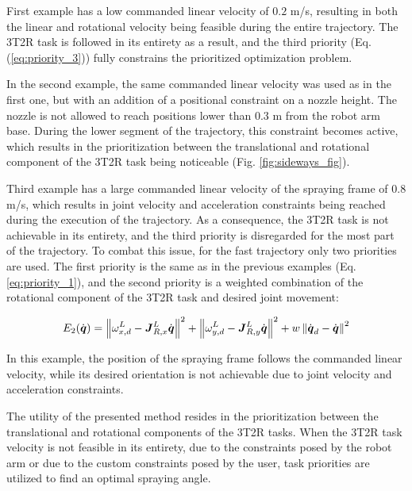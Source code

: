 First example has a low commanded linear velocity of $0.2$ m/s, resulting in both the linear and rotational velocity being feasible during the entire trajectory. The 3T2R task is followed in its entirety as a result, and the third priority (Eq. (\ref{eq:priority_3})) fully constrains the prioritized optimization problem. 

In the second example, the same commanded linear velocity was used as in the first one, but with an addition of a positional constraint on a nozzle height. The nozzle is not allowed to reach positions lower than $0.3$ m from the robot arm base. During the lower segment of the trajectory, this constraint becomes active, which results in the prioritization between the translational and rotational component of the 3T2R task being noticeable (Fig. \ref{fig:sideways_fig}).    


Third example has a large commanded linear velocity of the spraying frame of $0.8$ m/s, which results in joint velocity and acceleration constraints being reached during the execution of the trajectory. As a consequence, the 3T2R task is not achievable in its entirety, and the third priority is disregarded for the most part of the trajectory. To combat this issue, for the fast trajectory only two priorities are used. The first priority is the same as in the previous examples (Eq. \ref{eq:priority_1}), and the second priority is a weighted combination of the rotational component of the 3T2R task and desired joint movement:

\begin{equation} \label{eq:priority_2_2}
E_2(\dot{\boldsymbol{q}}) = \left\lVert  \omega^L_{x,d} - \boldsymbol{J}^L_{R,x}\dot{\boldsymbol{q}}  \right\rVert^2 + \left\lVert  \omega^L_{y,d} - \boldsymbol{J}^L_{R,y}\dot{\boldsymbol{q}}  \right\rVert^2 + w\left\lVert  \dot{\boldsymbol{q}}_d - \dot{\boldsymbol{q}}  \right\rVert^2
\end{equation}

In this example, the position of the spraying frame follows the commanded linear velocity, while its desired orientation is not achievable due to joint velocity and acceleration constraints.

The utility of the presented method resides in the prioritization between the translational and rotational components of the 3T2R tasks. When the 3T2R task velocity is not feasible in its entirety, due to the constraints posed by the robot arm or due to the custom constraints posed by the user, task priorities are utilized to find an optimal spraying angle.


